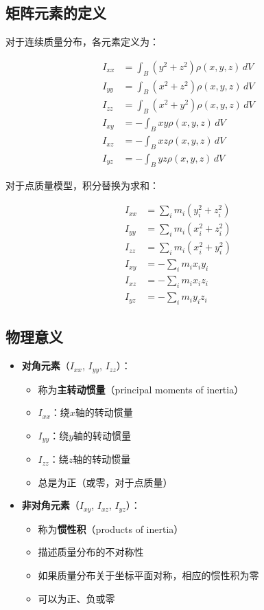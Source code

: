 \documentclass[12pt,a4paper]{article}
\begin{document}
\subsection{矩阵元素的定义}

对于连续质量分布，各元素定义为：

\begin{align}
I_{xx} &= \int_B (y^2 + z^2) \rho(x, y, z) \, dV \label{eq:Ixx} \\
I_{yy} &= \int_B (x^2 + z^2) \rho(x, y, z) \, dV \label{eq:Iyy} \\
I_{zz} &= \int_B (x^2 + y^2) \rho(x, y, z) \, dV \label{eq:Izz} \\
I_{xy} &= -\int_B xy \rho(x, y, z) \, dV \label{eq:Ixy} \\
I_{xz} &= -\int_B xz \rho(x, y, z) \, dV \label{eq:Ixz} \\
I_{yz} &= -\int_B yz \rho(x, y, z) \, dV \label{eq:Iyz}
\end{align}

对于点质量模型，积分替换为求和：

\begin{align}
I_{xx} &= \sum_i m_i (y_i^2 + z_i^2) \\
I_{yy} &= \sum_i m_i (x_i^2 + z_i^2) \\
I_{zz} &= \sum_i m_i (x_i^2 + y_i^2) \\
I_{xy} &= -\sum_i m_i x_i y_i \\
I_{xz} &= -\sum_i m_i x_i z_i \\
I_{yz} &= -\sum_i m_i y_i z_i
\end{align}

\subsection{物理意义}

\begin{itemize}
\item \textbf{对角元素}（$I_{xx}$, $I_{yy}$, $I_{zz}$）：
\begin{itemize}
\item 称为\textbf{主转动惯量}（principal moments of inertia）
\item $I_{xx}$：绕$x$轴的转动惯量
\item $I_{yy}$：绕$y$轴的转动惯量
\item $I_{zz}$：绕$z$轴的转动惯量
\item 总是为正（或零，对于点质量）
\end{itemize}

\item \textbf{非对角元素}（$I_{xy}$, $I_{xz}$, $I_{yz}$）：
\begin{itemize}
\item 称为\textbf{惯性积}（products of inertia）
\item 描述质量分布的不对称性
\item 如果质量分布关于坐标平面对称，相应的惯性积为零
\item 可以为正、负或零
\end{itemize}
\end{itemize}
\end{document}
